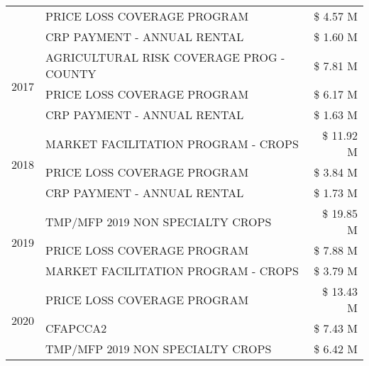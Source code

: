 \begin{tabular}{llr}
 & PRICE LOSS COVERAGE PROGRAM & \$ 4.57 M \\
 & CRP PAYMENT - ANNUAL RENTAL & \$ 1.60 M \\
\cline{1-3}
\multirow[t]{3}{*}{2017} & AGRICULTURAL RISK COVERAGE PROG - COUNTY & \$ 7.81 M \\
 & PRICE LOSS COVERAGE PROGRAM & \$ 6.17 M \\
 & CRP PAYMENT - ANNUAL RENTAL & \$ 1.63 M \\
\cline{1-3}
\multirow[t]{3}{*}{2018} & MARKET FACILITATION PROGRAM - CROPS & \$ 11.92 M \\
 & PRICE LOSS COVERAGE PROGRAM & \$ 3.84 M \\
 & CRP PAYMENT - ANNUAL RENTAL & \$ 1.73 M \\
\cline{1-3}
\multirow[t]{3}{*}{2019} & TMP/MFP 2019 NON SPECIALTY CROPS & \$ 19.85 M \\
 & PRICE LOSS COVERAGE PROGRAM & \$ 7.88 M \\
 & MARKET FACILITATION PROGRAM - CROPS & \$ 3.79 M \\
\cline{1-3}
\multirow[t]{3}{*}{2020} & PRICE LOSS COVERAGE PROGRAM & \$ 13.43 M \\
 & CFAPCCA2 & \$ 7.43 M \\
 & TMP/MFP 2019 NON SPECIALTY CROPS & \$ 6.42 M \\
\cline{1-3}
\bottomrule
\end{tabular}
